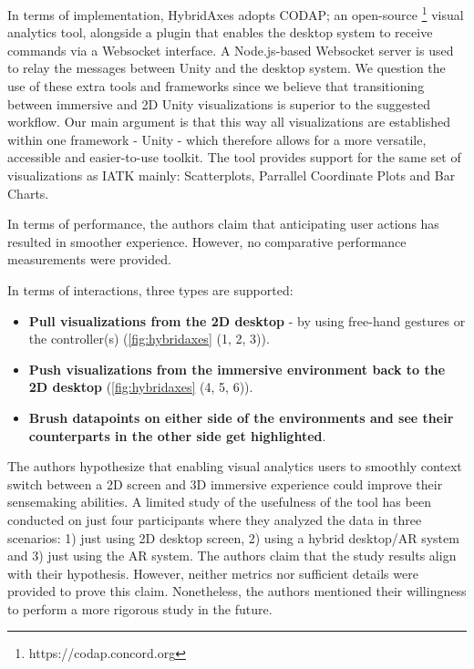 \documentclass{vgtc}                          %
\begin{document}
\medskip

\noindent In terms of implementation, HybridAxes adopts CODAP; an open-source
\footnote{https://codap.concord.org} visual analytics tool, alongside a plugin
that enables the desktop system to receive commands via a Websocket interface.
A Node.js-based Websocket server is used to relay the messages between Unity
and the desktop system. We question the use of these extra tools and frameworks
since we believe that transitioning between immersive and 2D Unity
visualizations is superior to the suggested workflow. Our main argument is
that this way all visualizations are established within one framework - Unity -
which therefore allows for a more versatile, accessible and easier-to-use
toolkit. The tool provides support for the same set of visualizations as IATK
mainly: Scatterplots, Parrallel Coordinate Plots and Bar Charts.

\medskip

\noindent In terms of performance, the authors claim that anticipating user actions has resulted in smoother
experience. However, no comparative performance measurements were provided.

\smallskip

\noindent In terms of interactions, three types are supported:
\begin{itemize}
	\item \textbf{Pull visualizations from the 2D desktop} - by using free-hand gestures
	      or the controller(s) (\autoref{fig:hybridaxes} (1, 2, 3)).
	\item \textbf{Push visualizations from the immersive environment back to the 2D
		      desktop} (\autoref{fig:hybridaxes} (4, 5, 6)).
	\item \textbf{Brush datapoints on either side of the environments and see their
		      counterparts in the other side get highlighted}.
\end{itemize}


\noindent The authors hypothesize that enabling visual analytics users to
smoothly context switch between a 2D screen and 3D immersive experience could
improve their sensemaking abilities. A limited study of the usefulness of the
tool has been conducted on just four participants where they analyzed the data
in three scenarios: 1) just using 2D desktop screen, 2) using a hybrid
desktop/AR system and 3) just using the AR system. The authors claim that the
study results align with their hypothesis. However, neither metrics nor
sufficient details were provided to prove this claim. Nonetheless, the authors
mentioned their willingness to perform a more rigorous study in the future.
\end{document}
